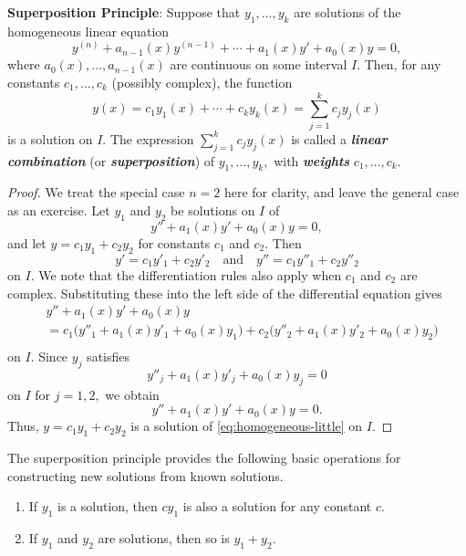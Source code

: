 \begin{framed}
\noindent\textbf{Superposition Principle}:\label{superposition} Suppose that $y_1, \dots, y_k$ are solutions  of the  homogeneous linear equation 
\[y^{(n)} + a_{n-1}(x)y^{(n-1)} + \cdots + a_1(x)y' + a_0(x)y = 0,\]
where   \( a_0(x), \dots, a_{n-1}(x) \)  are continuous on some interval \( I .\) Then, for any constants $c_1, \dots, c_k$ (possibly  complex), the function 
\[y(x) = c_1y_1(x) + \cdots+c_k y_k(x) = \sum_{j=1}^k c_j y_j(x)\] is a solution on $I.$  The expression \(\sum_{j=1}^k c_j y_j(x)\) is called a \textbf{\textit{linear combination}} (or \textbf{\textit{superposition}}) of $y_1, \dots, y_k,$ with \textbf{\textit{weights}}  $c_1, \dots, c_k.$  
\end{framed}
\begin{proof}
	We treat  the special case  $n=2$ here for clarity, and leave the general case as an exercise. Let $y_1$ and $y_2$  be solutions on $I$ of 
	\begin{equation}\label{eq:homogeneous-little}
		y'' + a_1(x)y' + a_0(x)y = 0,
	\end{equation}
	and let $y = c_1 y_1 + c_2y_2$ for constants $c_1$ and $c_2.$
Then
	\[y' = c_1 y'_1 + c_2y'_2\quad\mbox{and}\quad y'' = c_1 y''_1 + c_2y''_2\] on $I.$  We note that
	the differentiation rules also  apply when \(c_1\) and \(c_2\) are complex.
Substituting these into the left side of the differential equation gives
	\[\begin{split}
&y'' + a_1(x)y' + a_0(x)y\\
&=c_1\big(y''_1 + a_1(x)y'_1 + a_0(x)y_1\big)+c_2\big(y''_2 + a_1(x)y'_2 + a_0(x)y_2\big)\\
\end{split}\] on $I.$
	 Since $y_j$ satisfies
	 \[y''_j + a_1(x)y'_j + a_0(x)y_j = 0\] on $I$ for $j = 1, 2,$ we obtain
	 \[y'' + a_1(x)y' + a_0(x)y=0.\]
	  Thus,
	 $y= c_1y_1 +c_2y_2$ is a solution of \eqref{eq:homogeneous-little} on $I.$ 
\end{proof}

\begin{remark} The superposition principle provides the following  basic operations for constructing new solutions from known solutions.
	\begin{enumerate}[label=(\roman*),noitemsep]
		\item If $y_1$ is a solution, then $cy_1$ is also a solution for any constant $c$.
		\item If $y_1$ and  $y_2$ are solutions, then so is $y_1 +y_2.$
	\end{enumerate}
\end{remark}

